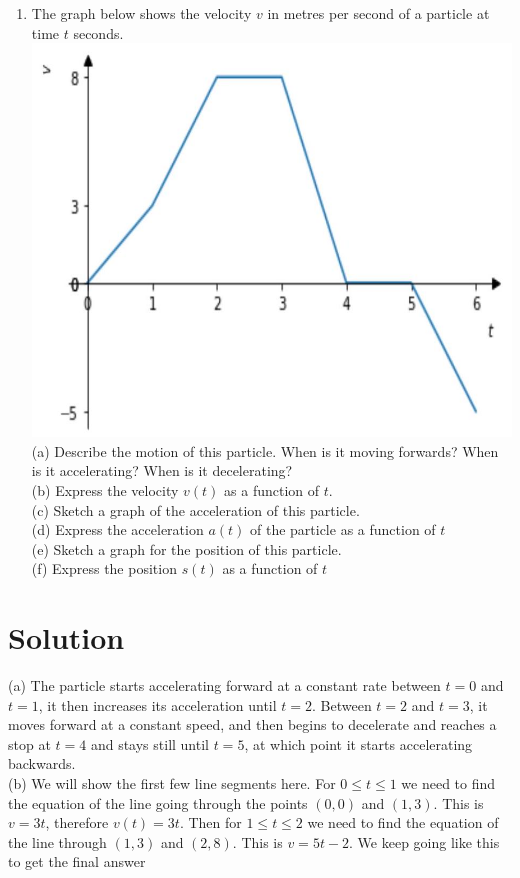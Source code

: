 \documentclass[10pt]{article}
\begin{document}
\begin{enumerate}
  \item The graph below shows the velocity $v$ in metres per second of a particle at time $t$ seconds.\\
\includegraphics[max width=\textwidth, center]{2024_12_26_f16b160c9a5a429665deg-1}\\
(a) Describe the motion of this particle. When is it moving forwards? When is it accelerating? When is it decelerating?\\
(b) Express the velocity $v(t)$ as a function of $t$.\\
(c) Sketch a graph of the acceleration of this particle.\\
(d) Express the acceleration $a(t)$ of the particle as a function of $t$\\
(e) Sketch a graph for the position of this particle.\\
(f) Express the position $s(t)$ as a function of $t$
\end{enumerate}

\section*{Solution}
(a) The particle starts accelerating forward at a constant rate between $t=0$ and $t=1$, it then increases its acceleration until $t=2$. Between $t=2$ and $t=3$, it moves forward at a constant speed, and then begins to decelerate and reaches a stop at $t=4$ and stays still until $t=5$, at which point it starts accelerating backwards.\\
(b) We will show the first few line segments here. For $0 \leq t \leq 1$ we need to find the equation of the line going through the points $(0,0)$ and $(1,3)$. This is $v=3 t$, therefore $v(t)=3 t$. Then for $1 \leq t \leq 2$ we need to find the equation of the line through $(1,3)$ and $(2,8)$. This is $v=5 t-2$. We keep going like this to get the final answer
\end{document}
